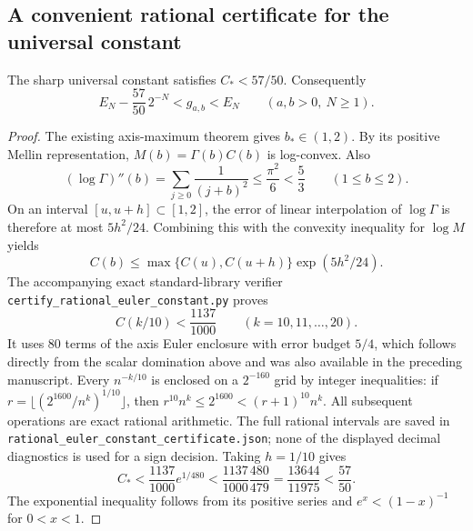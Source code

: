 \subsection{A convenient rational certificate for the universal constant}
\begin{proposition}
\label{newEuler:prop:rational}
The sharp universal constant satisfies $C_*<57/50$. Consequently
\[
 E_N-\frac{57}{50}\,2^{-N}<g_{a,b}<E_N
 \qquad(a,b>0,\ N\ge1).
\]
\end{proposition}
\begin{proof}
The existing axis-maximum theorem gives $b_*\in(1,2)$. By its positive
Mellin representation, $M(b)=\Gamma(b)C(b)$ is log-convex. Also
\[
 (\log\Gamma)''(b)=\sum_{j\ge0}\frac1{(j+b)^2}
 \le\frac{\pi^2}{6}<\frac53\qquad(1\le b\le2).
\]
On an interval $[u,u+h]\subset[1,2]$, the error of linear
interpolation of $\log\Gamma$ is therefore at most $5h^2/24$.
Combining this with the convexity inequality for $\log M$ yields
\[
 C(b)\le\max\{C(u),C(u+h)\}\exp(5h^2/24).
\]
The accompanying exact standard-library verifier
\texttt{certify\_rational\_euler\_constant.py} proves
\[
 C(k/10)<\frac{1137}{1000}\qquad(k=10,11,\ldots,20).
\]
It uses 80 terms of the axis Euler enclosure with error
budget $5/4$, which follows directly from the scalar domination above
and was also available in the preceding manuscript. Every $n^{-k/10}$ is enclosed on a $2^{-160}$ grid
by integer inequalities: if
$r=\lfloor (2^{1600}/n^k)^{1/10}\rfloor$, then
$r^{10}n^k\le2^{1600}<(r+1)^{10}n^k$. All subsequent operations
are exact rational arithmetic. The full rational intervals are saved
in \texttt{rational\_euler\_constant\_certificate.json}; none of the
displayed decimal diagnostics is used for a sign decision.
Taking $h=1/10$ gives
\[
 C_*<\frac{1137}{1000}e^{1/480}
 <\frac{1137}{1000}\frac{480}{479}
 =\frac{13644}{11975}<\frac{57}{50}.
\]
The exponential inequality follows from its positive series and
$e^x<(1-x)^{-1}$ for $0<x<1$.
\end{proof}

